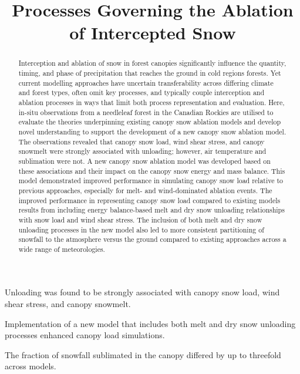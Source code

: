 \documentclass[
]{agujournal2019}
\begin{document}
\title{Processes Governing the Ablation of Intercepted Snow}


\begin{keypoints}
\item Unloading was found to be strongly associated with canopy snow
load, wind shear stress, and canopy snowmelt. \item Implementation of a
new model that includes both melt and dry snow unloading processes
enhanced canopy load simulations. \item The fraction of snowfall
sublimated in the canopy differed by up to threefold across models. 
\end{keypoints}

\begin{abstract}
Interception and ablation of snow in forest canopies significantly
influence the quantity, timing, and phase of precipitation that reaches
the ground in cold regions forests. Yet current modelling approaches
have uncertain transferability across differing climate and forest
types, often omit key processes, and typically couple interception and
ablation processes in ways that limit both process representation and
evaluation. Here, in-situ observations from a needleleaf forest in the
Canadian Rockies are utilised to evaluate the theories underpinning
existing canopy snow ablation models and develop novel understanding to
support the development of a new canopy snow ablation model. The
observations revealed that canopy snow load, wind shear stress, and
canopy snowmelt were strongly associated with unloading; however, air
temperature and sublimation were not. A new canopy snow ablation model
was developed based on these associations and their impact on the canopy
snow energy and mass balance. This model demonstrated improved
performance in simulating canopy snow load relative to previous
approaches, especially for melt- and wind-dominated ablation events. The
improved performance in representing canopy snow load compared to
existing models results from including energy balance-based melt and dry
snow unloading relationships with snow load and wind shear stress. The
inclusion of both melt and dry snow unloading processes in the new model
also led to more consistent partitioning of snowfall to the atmosphere
versus the ground compared to existing approaches across a wide range of
meteorologies.
\end{abstract}
\end{document}

